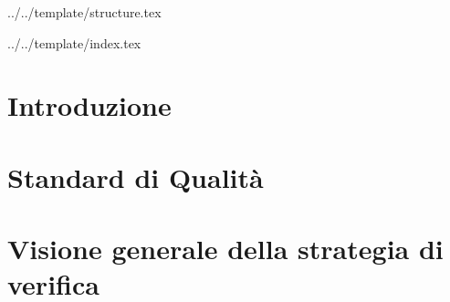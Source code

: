 


\def\DOCUMENTO{Piano di Qualifica}
\def\VERSIONE{2.0.0}

\def\REDATTORE {Agostinetto Matteo \\ & Crespan Emanuele}
\def\VERIFICATORE {Ros Fabio}
\def\RESPONSABILE {Carraro Nicola}

\def\USO {Esterno}

\def\DISTRIBUZIONE {\GRUPPO{}\\ & \COMMITTENTE{}\\ & \PROPONENTE{}\\}

\def\DESCRIZIONE {Documento riguardante le strategie di verifica e validazione adottate dal gruppo \GRUPPO\ necessarie ad assicurare i requisiti qualitativi nello svolgimento del progetto \PROGETTO.}


\def\INDICE	{true}
\def\TABELLE {true}
\def\FIGURE {true}


 {../../template/structure.tex}



 {../../template/index.tex}



%

\section{Introduzione}


\newpage
\section{Standard di Qualità}


\newpage
\section{Visione generale della strategia di verifica}


